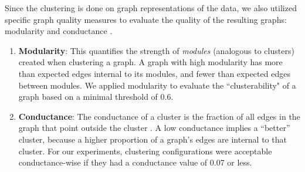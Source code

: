 \documentclass{bmcart}
\begin{document}
Since the clustering is done on graph representations of the data, we also utilized specific graph quality measures to evaluate the quality of the resulting graphs: modularity \cite{newman2006modularity} and conductance \cite{CondSparse}. 
\begin{enumerate}
\item \textbf{Modularity}: This quantifies the strength of \textit{modules} (analogous to clusters) created when clustering a graph. A graph with high modularity has more than expected edges internal to its modules, and fewer than expected edges between modules.  We applied modularity to evaluate the ``clusterability" of a graph based on a minimal threshold of 0.6.
\item \textbf{Conductance}: The conductance of a cluster is the fraction of all edges in the graph that point outside the cluster \cite{comscore-icdm12}.  A low conductance implies a ``better'' cluster, because a higher proportion of a graph's edges are internal to that cluster. For our experiments, clustering configurations were acceptable conductance-wise if they had a conductance value of 0.07 or less. 

\end{enumerate}
\end{document}
